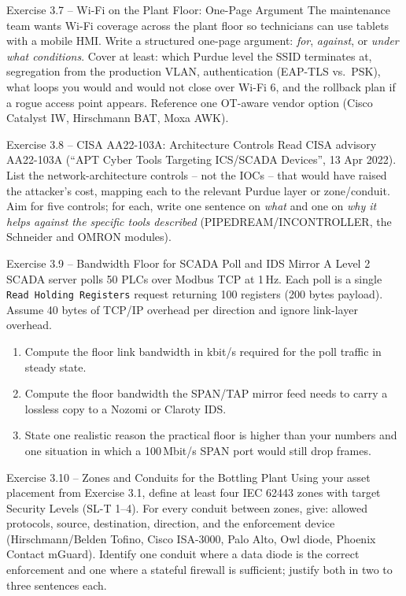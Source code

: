 \documentclass[11pt,a4paper]{article}
\begin{document}
\begin{taskbox}{Exercise 3.7 -- Wi-Fi on the Plant Floor: One-Page Argument}
The maintenance team wants Wi-Fi coverage across the plant floor so technicians can use tablets with a mobile HMI. Write a structured one-page argument: \emph{for}, \emph{against}, or \emph{under what conditions}. Cover at least: which Purdue level the SSID terminates at, segregation from the production VLAN, authentication (EAP-TLS vs.\ PSK), what loops you would and would not close over Wi-Fi 6, and the rollback plan if a rogue access point appears. Reference one OT-aware vendor option (Cisco Catalyst IW, Hirschmann BAT, Moxa AWK).
\end{taskbox}

\begin{taskbox}{Exercise 3.8 -- CISA AA22-103A: Architecture Controls}
Read CISA advisory AA22-103A (``APT Cyber Tools Targeting ICS/SCADA Devices'', 13 Apr 2022). List the network-architecture controls -- not the IOCs -- that would have raised the attacker's cost, mapping each to the relevant Purdue layer or zone/conduit. Aim for five controls; for each, write one sentence on \emph{what} and one on \emph{why it helps against the specific tools described} (PIPEDREAM/INCONTROLLER, the Schneider and OMRON modules).
\end{taskbox}

\begin{taskbox}{Exercise 3.9 -- Bandwidth Floor for SCADA Poll and IDS Mirror}
A Level 2 SCADA server polls 50 PLCs over Modbus TCP at 1\,Hz. Each poll is a single \texttt{Read Holding Registers} request returning 100 registers (200 bytes payload). Assume 40 bytes of TCP/IP overhead per direction and ignore link-layer overhead.
\begin{enumerate}\setlength{\itemsep}{1pt}
  \item Compute the floor link bandwidth in kbit/s required for the poll traffic in steady state.
  \item Compute the floor bandwidth the SPAN/TAP mirror feed needs to carry a lossless copy to a Nozomi or Claroty IDS.
  \item State one realistic reason the practical floor is higher than your numbers and one situation in which a 100\,Mbit/s SPAN port would still drop frames.
\end{enumerate}
\end{taskbox}

\begin{taskbox}{Exercise 3.10 -- Zones and Conduits for the Bottling Plant}
Using your asset placement from Exercise 3.1, define at least four IEC 62443 zones with target Security Levels (SL-T 1--4). For every conduit between zones, give: allowed protocols, source, destination, direction, and the enforcement device (Hirschmann/Belden Tofino, Cisco ISA-3000, Palo Alto, Owl diode, Phoenix Contact mGuard). Identify one conduit where a data diode is the correct enforcement and one where a stateful firewall is sufficient; justify both in two to three sentences each.
\end{taskbox}
\end{document}
